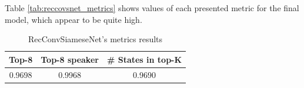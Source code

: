 Table \vref{tab:reccovsnet_metrics} shows values of each presented metric for the final model, which appear to be quite high. 

\begin{footnotesize}
	\begin{table}
		\centering
		\caption{RecConvSiameseNet's metrics results}
		\begin{tabularx}{0.5\textwidth}{ccc}
			\toprule
			\textbf{Top-8} 				& \textbf{Top-8 speaker} & \textbf{\# States in top-K}    \\
			\midrule
			0.9698	              		& 0.9968                     & 0.9690         \\[0.25cm]
			\bottomrule
		\end{tabularx}
		
	\end{table}\label{tab:reccovsnet_metrics}
\end{footnotesize}